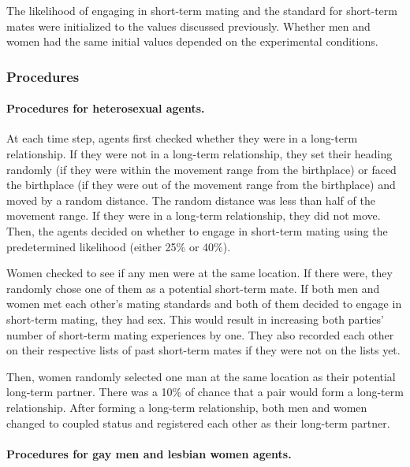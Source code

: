 \documentclass[
  11pt,
]{article}
\begin{document}
The likelihood of engaging in short-term mating and the standard for
short-term mates were initialized to the values discussed previously.
Whether men and women had the same initial values depended on the
experimental conditions.

\hypertarget{procedures}{%
\subsubsection{Procedures}\label{procedures}}

\hypertarget{procedures-for-heterosexual-agents.}{%
\paragraph{Procedures for heterosexual
agents.}\label{procedures-for-heterosexual-agents.}}

At each time step, agents first checked whether they were in a long-term
relationship. If they were not in a long-term relationship, they set
their heading randomly (if they were within the movement range from the
birthplace) or faced the birthplace (if they were out of the movement
range from the birthplace) and moved by a random distance. The random
distance was less than half of the movement range. If they were in a
long-term relationship, they did not move. Then, the agents decided on
whether to engage in short-term mating using the predetermined
likelihood (either 25\% or 40\%).

Women checked to see if any men were at the same location. If there
were, they randomly chose one of them as a potential short-term mate. If
both men and women met each other's mating standards and both of them
decided to engage in short-term mating, they had sex. This would result
in increasing both parties' number of short-term mating experiences by
one. They also recorded each other on their respective lists of past
short-term mates if they were not on the lists yet.

Then, women randomly selected one man at the same location as their
potential long-term partner. There was a 10\% of chance that a pair
would form a long-term relationship. After forming a long-term
relationship, both men and women changed to coupled status and
registered each other as their long-term partner.

\hypertarget{procedures-for-gay-men-and-lesbian-women-agents.}{%
\paragraph{Procedures for gay men and lesbian women
agents.}\label{procedures-for-gay-men-and-lesbian-women-agents.}}
\end{document}
